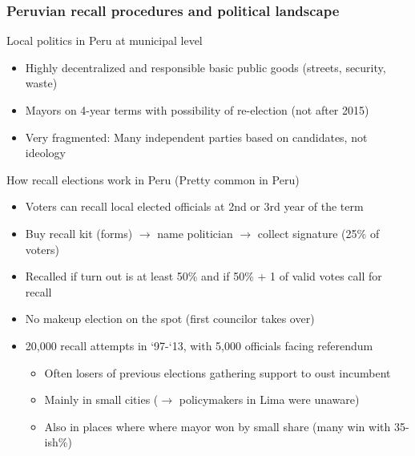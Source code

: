\documentclass[aspectratio=169]{beamer}
\begin{document}
\begin{frame}
  \frametitle{Peruvian recall procedures and political landscape}
Local politics in Peru at municipal level
\begin{itemize}\setlength\itemsep{3pt}
\item Highly decentralized and responsible basic public goods (streets, security, waste)
\item Mayors on 4-year terms with possibility of re-election (not after 2015)
\item Very fragmented: Many independent parties based on candidates, not ideology
\end{itemize}\medskip
How recall elections work in Peru (Pretty common  in Peru)
\begin{itemize}\setlength\itemsep{3pt}
\item Voters can recall local elected officials at 2nd or 3rd year of the term
\item Buy recall kit (forms) $\to$ name politician $\to$ collect signature (25\% of voters)
\item Recalled if turn out is at least 50\% and if 50\% + 1 of valid votes call for recall
\item No makeup election on the spot (first councilor takes over)
\item 20,000 recall attempts in `97-`13, with 5,000 officials facing referendum
\begin{itemize}\setlength\itemsep{3pt}
\item Often losers of previous elections gathering support to oust incumbent 
\item Mainly in small cities ($\to$ policymakers in Lima were unaware) 
\item Also in places where where mayor won by small share (many win with 35-ish\%)
\end{itemize}
\end{itemize}
\end{frame}
\end{document}
